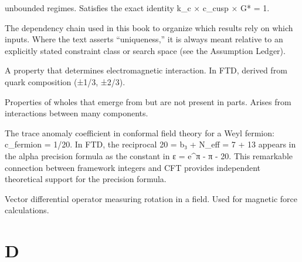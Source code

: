 \documentclass[
  11pt,
  letterpaper,
  twoside,
  openright]{book}
\begin{document}
\begin{description}
unbounded regimes. Satisfies the exact identity k\_c × c\_cusp × G* = 1.
\item[\textbf{Chain of Necessity}]
The dependency chain used in this book to organize which results rely on
which inputs. Where the text asserts ``uniqueness,'' it is always meant
relative to an explicitly stated constraint class or search space (see
the Assumption Ledger).
\item[\textbf{Charge}]
A property that determines electromagnetic interaction. In FTD, derived
from quark composition (±1/3, ±2/3).
\item[\textbf{Complexity}]
Properties of wholes that emerge from but are not present in parts.
Arises from interactions between many components.
\item[\textbf{Conformal Anomaly (c\_fermion)}]
The trace anomaly coefficient in conformal field theory for a Weyl
fermion: c\_fermion = 1/20. In FTD, the reciprocal 20 = b₃ + N\_eff = 7
+ 13 appears in the alpha precision formula as the constant in ε =
e\^{}π - π - 20. This remarkable connection between framework integers
and CFT provides independent theoretical support for the precision
formula.
\item[\textbf{Curl}]
Vector differential operator measuring rotation in a field. Used for
magnetic force calculations.
\end{description}

\section{D}\label{d}
\end{document}
